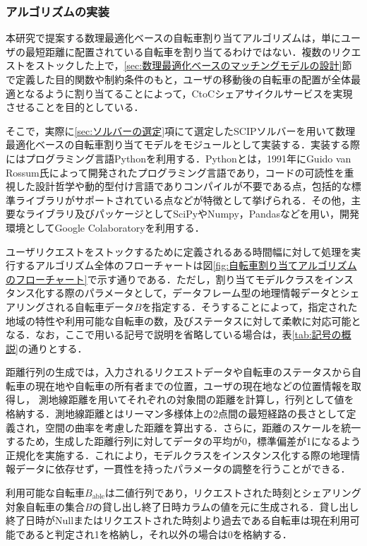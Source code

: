       \subsubsection{アルゴリズムの実装}
        \label{sec:アルゴリズムの実装}
          \par 本研究で提案する数理最適化ベースの自転車割り当てアルゴリズムは，単にユーザの最短距離に配置されている自転車を割り当てるわけではない．複数のリクエストをストックした上で，\ref{sec:数理最適化ベースのマッチングモデルの設計}節で定義した目的関数や制約条件のもと，ユーザの移動後の自転車の配置が全体最適となるように割り当てることによって，CtoCシェアサイクルサービスを実現させることを目的としている．
          \par そこで，実際に\ref{sec:ソルバーの選定}項にて選定したSCIPソルバーを用いて数理最適化ベースの自転車割り当てモデルをモジュールとして実装する．実装する際にはプログラミング言語Pythonを利用する．Pythonとは，1991年にGuido van Rossum氏によって開発されたプログラミング言語であり，コードの可読性を重視した設計哲学や動的型付け言語でありコンパイルが不要である点，包括的な標準ライブラリがサポートされている点などが特徴として挙げられる．その他，主要なライブラリ及びパッケージとしてSciPyやNumpy，Pandasなどを用い，開発環境としてGoogle Colaboratoryを利用する．
          \par ユーザリクエストをストックするために定義されるある時間幅に対して処理を実行するアルゴリズム全体のフローチャートは図\ref{fig:自転車割り当てアルゴリズムのフローチャート}で示す通りである．ただし，割り当てモデルクラスをインスタンス化する際のパラメータとして，データフレーム型の地理情報データとシェアリングされる自転車データ$B$を指定する．そうすることによって，指定された地域の特性や利用可能な自転車の数，及びステータスに対して柔軟に対応可能となる．なお，ここで用いる記号で説明を省略している場合は，表\ref{tab:記号の概説}の通りとする．
          \par 距離行列の生成では，入力されるリクエストデータや自転車のステータスから自転車の現在地や自転車の所有者までの位置，ユーザの現在地などの位置情報を取得し， 測地線距離を用いてそれぞれの対象間の距離を計算し，行列として値を格納する．測地線距離とはリーマン多様体上の2点間の最短経路の長さとして定義され，空間の曲率を考慮した距離を算出する．さらに，距離のスケールを統一するため，生成した距離行列に対してデータの平均が0，標準偏差が1になるよう正規化を実施する．これにより，モデルクラスをインスタンス化する際の地理情報データに依存せず，一貫性を持ったパラメータの調整を行うことができる．
          \par 利用可能な自転車$B_{\text{able}}$は二値行列であり，リクエストされた時刻とシェアリング対象自転車の集合$B$の貸し出し終了日時カラムの値を元に生成される．貸し出し終了日時がNullまたはリクエストされた時刻より過去である自転車は現在利用可能であると判定され1を格納し，それ以外の場合は0を格納する．

